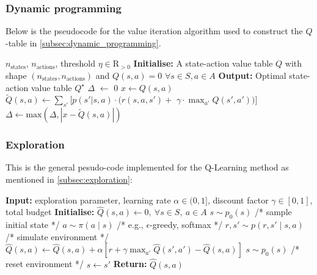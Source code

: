 \documentclass{article}
\theoremstyle{plain}
\theoremstyle{definition}
\theoremstyle{remark}
\begin{document}
{\subsubsection{Dynamic programming}
\vspace{-2mm}
Below is the pseudocode for the value iteration algorithm used to construct the $Q$-table in 
\vspace{-4mm}
\autoref{subsec:dynamic_programming}.
\begin{algorithm}[H]
   \caption{Tabular Q-value iteration}
   \label{alg:Q_value_iteration}
\begin{algorithmic}
    $n_\text{states}$, $n_\text{actions}$, threshold $\eta \in\mathrm{R}_{>0}$
   \STATE \textbf{Initialise:} A state-action value table $Q$ with shape $(n_\text{states},n_\text{actions})$ and $Q(s,a)=0$ $\forall s\in S, a \in A$
   \STATE \textbf{Output:} Optimal state-action value table $Q^\star$
   \REPEAT
   \STATE $\Delta$ $\leftarrow$ 0
   \STATE $x \leftarrow Q(s,a)$ \\
   \STATE $\tilde{Q}(s,a) \leftarrow \sum_{s'}[p(s'|s,a) \cdot (r(s,a,s')+$
   \STATE $\gamma \cdot \max_{a'}Q(s',a'))]$ \\
   \STATE $\Delta \leftarrow \text{max}\left(\Delta,|x - \tilde{Q}(s,a)|\right)$
   \ENDFOR
   \ENDFOR
   \UNTIL{$\Delta < \eta$}
\end{algorithmic}
\end{algorithm}
\vspace{-6mm}

\subsubsection{Exploration}
\vspace{-2mm}
This is the general pesudo-code implemented for the Q-Learning method as mentioned in \autoref{subsec:exploration}:

\vspace{-4mm}
\begin{algorithm}[H]
   \caption{Tabular Q-learning}
   \label{alg:tabular_q_learning}
\begin{algorithmic}
   \STATE \textbf{Input:} exploration parameter, learning rate $\alpha \in (0,1]$, discount factor $\gamma \in [0,1]$, total budget
   \STATE \textbf{Initialise:} $\hat{Q}(s,a)\leftarrow 0,\ \forall s\in S,\ a\in A$
   \STATE $s \sim p_0(s)$ \hfill /* sample initial state */
      \STATE $a \sim \pi(a\mid s)$ \hfill /* e.g., $\epsilon$-greedy, softmax */
      \STATE $r,s' \sim p(r,s' \mid s,a)$ \hfill /* simulate environment */
      \STATE $\hat{Q}(s,a)\leftarrow \hat{Q}(s,a)+\alpha\left[r+\gamma\max_{a'}\hat{Q}(s',a')-\hat{Q}(s,a)\right]$
         \STATE $s \sim p_0(s)$ \hfill /* reset environment */
      \ELSE
         \STATE $s \leftarrow s'$
      \ENDIF
   \ENDWHILE
   \STATE \textbf{Return:} $\hat{Q}(s,a)$
\end{algorithmic}
\end{algorithm}
\vspace{-6mm}

}
\end{document}
